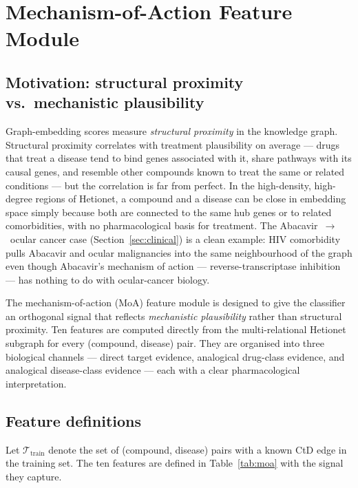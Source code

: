 \documentclass[twocolumn,10pt]{article}
\begin{document}
\section{Mechanism-of-Action Feature Module}
\label{sec:moa}

\subsection{Motivation: structural proximity vs.\ mechanistic plausibility}

Graph-embedding scores measure \emph{structural proximity} in the knowledge graph. Structural proximity correlates with treatment plausibility on average --- drugs that treat a disease tend to bind genes associated with it, share pathways with its causal genes, and resemble other compounds known to treat the same or related conditions --- but the correlation is far from perfect. In the high-density, high-degree regions of Hetionet, a compound and a disease can be close in embedding space simply because both are connected to the same hub genes or to related comorbidities, with no pharmacological basis for treatment. The Abacavir~$\to$~ocular cancer case (Section~\ref{sec:clinical}) is a clean example: HIV comorbidity pulls Abacavir and ocular malignancies into the same neighbourhood of the graph even though Abacavir's mechanism of action --- reverse-transcriptase inhibition --- has nothing to do with ocular-cancer biology.

The mechanism-of-action (MoA) feature module is designed to give the classifier an orthogonal signal that reflects \emph{mechanistic plausibility} rather than structural proximity. Ten features are computed directly from the multi-relational Hetionet subgraph for every (compound, disease) pair. They are organised into three biological channels --- direct target evidence, analogical drug-class evidence, and analogical disease-class evidence --- each with a clear pharmacological interpretation.

\subsection{Feature definitions}

Let $\mathcal{T}_{\mathrm{train}}$ denote the set of (compound, disease) pairs with a known CtD edge in the training set. The ten features are defined in Table~\ref{tab:moa} with the signal they capture.
\end{document}
